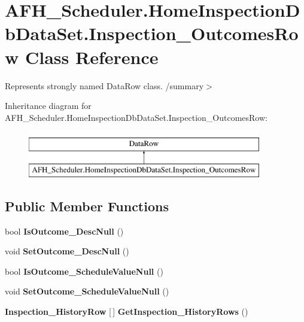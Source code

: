 \section{A\+F\+H\+\_\+\+Scheduler.\+Home\+Inspection\+Db\+Data\+Set.\+Inspection\+\_\+\+Outcomes\+Row Class Reference}
\label{class_a_f_h___scheduler_1_1_home_inspection_db_data_set_1_1_inspection___outcomes_row}


Represents strongly named Data\+Row class. /summary$>$  


Inheritance diagram for A\+F\+H\+\_\+\+Scheduler.\+Home\+Inspection\+Db\+Data\+Set.\+Inspection\+\_\+\+Outcomes\+Row\+:\begin{figure}[H]
\begin{center}
\leavevmode
\includegraphics[height=2.000000cm]{class_a_f_h___scheduler_1_1_home_inspection_db_data_set_1_1_inspection___outcomes_row}
\end{center}
\end{figure}
\subsection*{Public Member Functions}
\begin{DoxyCompactItemize}
\item 
\mbox{\label{class_a_f_h___scheduler_1_1_home_inspection_db_data_set_1_1_inspection___outcomes_row_a59291f9af7bab69843da6c5d6f19ab87}} 
bool {\bfseries Is\+Outcome\+\_\+\+Desc\+Null} ()
\item 
\mbox{\label{class_a_f_h___scheduler_1_1_home_inspection_db_data_set_1_1_inspection___outcomes_row_a8b411f86578884769f9fa01274707fe5}} 
void {\bfseries Set\+Outcome\+\_\+\+Desc\+Null} ()
\item 
\mbox{\label{class_a_f_h___scheduler_1_1_home_inspection_db_data_set_1_1_inspection___outcomes_row_a451c53b4d6790bdbdb1408f3e5c305cb}} 
bool {\bfseries Is\+Outcome\+\_\+\+Schedule\+Value\+Null} ()
\item 
\mbox{\label{class_a_f_h___scheduler_1_1_home_inspection_db_data_set_1_1_inspection___outcomes_row_aa16785752dbd1c6df5a8d444387e7245}} 
void {\bfseries Set\+Outcome\+\_\+\+Schedule\+Value\+Null} ()
\item 
\mbox{\label{class_a_f_h___scheduler_1_1_home_inspection_db_data_set_1_1_inspection___outcomes_row_ac899d5f3122cc666132a4d876b8beb5d}} 
\textbf{ Inspection\+\_\+\+History\+Row} [$\,$] {\bfseries Get\+Inspection\+\_\+\+History\+Rows} ()
\end{DoxyCompactItemize}
